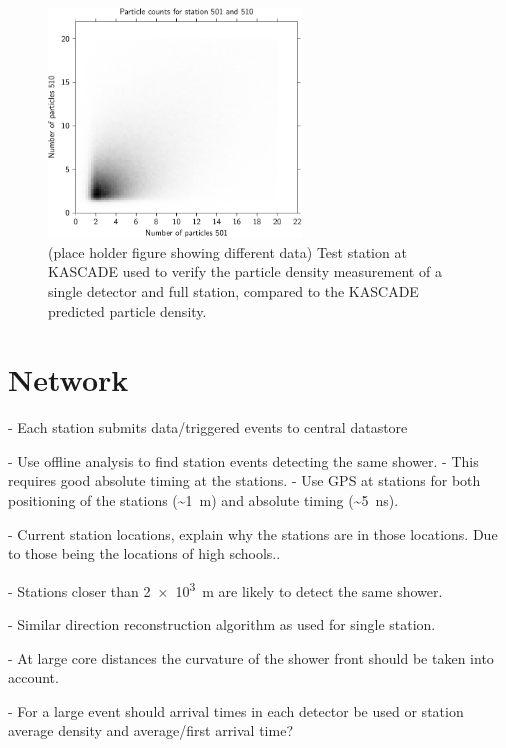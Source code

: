 \begin{figure}
    \centering
    \includegraphics[width=0.6\textwidth]
                    {plots/experiment/n_501_510_sum}
    \caption{(place holder figure showing different data) Test station at KASCADE used to verify the particle density measurement of a single detector and full station, compared to the KASCADE predicted particle density.}
    \label{fig:n_501_510_sum}
\end{figure}



\section{Network}


- Each station submits data/triggered events to central datastore

- Use offline analysis to find station events detecting the same shower.
    - This requires good absolute timing at the stations.
    - Use GPS at stations for both positioning of the stations (\SI{~1}{\meter}) and absolute timing (\SI{~5}{\ns}).

- Current station locations, explain why the stations are in those locations. Due to those being the locations of high schools..

- Stations closer than \SI{2e3}{\meter} are likely to detect the same shower.

- Similar direction reconstruction algorithm as used for single station.

- At large core distances the curvature of the shower front should be taken into account.

- For a large event should arrival times in each detector be used or station average density and average/first arrival time?

